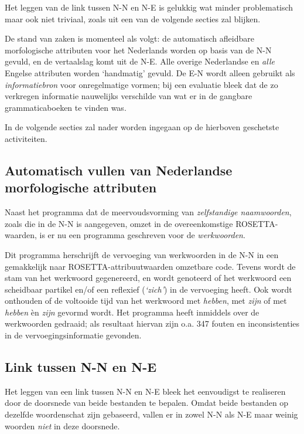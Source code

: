 Het leggen van de link tussen N-N en N-E is gelukkig wat minder problematisch 
maar ook niet triviaal, zoals uit een van de volgende secties zal blijken.

De stand van zaken is momenteel als volgt: de automatisch afleidbare
morfologische attributen voor het Nederlands worden op basis van de N-N gevuld,
en de vertaalslag komt uit de N-E. Alle overige Nederlandse en {\em alle} 
Engelse attributen worden `handmatig' gevuld. De E-N wordt alleen gebruikt als
{\em informatiebron} voor onregelmatige vormen; bij een evaluatie bleek dat de
zo verkregen informatie nauwelijks verschilde van wat er in de gangbare
grammaticaboeken te vinden was.

In de volgende secties zal nader worden ingegaan op de hierboven geschetste 
activiteiten.

\subsection{Automatisch vullen van Nederlandse morfologische attributen}

Naast het programma dat de meervoudsvorming van {\em zelfstandige naamwoorden},
zoals die in de N-N is aangegeven, omzet in de overeenkomstige ROSETTA-waarden,
is er nu een programma geschreven voor de {\em werkwoorden}.

Dit programma herschrijft de vervoeging van werkwoorden in de N-N in een 
gemakkelijk naar ROSETTA-attribuutwaarden omzetbare code. Tevens wordt de stam 
van het werkwoord gegenereerd, en wordt genoteerd of het werkwoord een 
scheidbaar partikel en/of een reflexief ({\em `zich'}) in de vervoeging heeft.
Ook wordt onthouden of de voltooide tijd van het werkwoord met {\em hebben}, met
{\em zijn} of met {\em hebben} \`{e}n {\em zijn} gevormd wordt.
Het programma heeft inmiddels over de werkwoorden gedraaid; als resultaat 
hiervan zijn o.a. 347 fouten en inconsistenties in de vervoegingsinformatie
gevonden.

\subsection{Link tussen N-N en N-E}

Het leggen van een link tussen N-N en N-E bleek het eenvoudigst te realiseren 
door
de doorsnede van beide bestanden te bepalen. Omdat beide bestanden op dezelfde
woordenschat zijn gebaseerd, vallen er in zowel N-N als N-E maar weinig
woorden {\em niet} in deze doorsnede.

